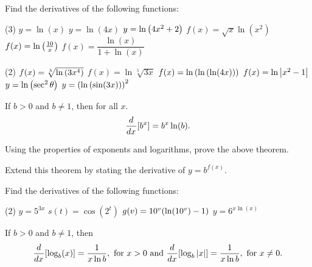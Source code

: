 \documentclass[mathNotesPreamble]{subfiles}
\begin{document}
  \begin{ex*}
    Find the derivatives of the following functions:
  \end{ex*}
  \begin{tasks}[after-item-skip=\stretch{1}, label=~](3)
    \task $y=\ln(x)$
    \task $y=\ln(4x)$
    \task $y=\ln{\left(4x^2+2\right)}$
    \task $f(x)=\sqrt x\ln(x^2)$
    \task $f(x)=\ln{\left(\frac{10}{x}\right)}$
    \task $f(x)=\dfrac{\ln(x)}{1+\ln(x)}$
  \end{tasks}
  \vfill
  
  \pagebreak
  \begin{tasks}[after-item-skip=\stretch{1}, label=~](2)
    \task $f(x)=\sqrt[5]{\ln{\left(3x^4\right)}}$
    \task $f(x)=\ln\sqrt[5]{3x}$
    \task $f(x)=\ln{\left(\ln{\left(\ln(4x)\right)}\right)}$
    \task $f(x)=\ln{\left\vert x^2-1\right\vert}$
    \task $y=\ln{\left(\sec^2\theta\right)}$
    \task $y={\left(\ln{\left(\sin(3x)\right)}\right)}^2$
  \end{tasks}
  \vfill 
  \pagebreak
  
  \begin{thmBox*}
    If $b>0$ and $b\neq 1$, then for all $x$.
      $${\frac{d^{}}{dx^{}}}{\left[b^x\right]}=b^x\ln(b).$$
  \end{thmBox*}

  \begin{ex*}
    Using the properties of exponents and logarithms, prove the above theorem. 
    
    \noindent
    Extend this theorem by stating the derivative of $y=b^{f(x)}$.
  \end{ex*}
  
  \begin{ex*}
    Find the derivatives of the following functions:
  \end{ex*}
  \begin{tasks}[after-item-skip=\stretch{1}, label=~](2)
    \task $y=5^{3x}$
    \task $s(t)=\cos(2^t)$
    \task $g(v)=10^v{\left(\ln(10^v)-1\right)}$
    \task $y=6^{x\ln(x)}$
  \end{tasks}
  \pagebreak
  
  \begin{thmBox*}
    If $b>0$ and $b\neq 1$, then
      \[{\frac{d^{}}{dx^{}}}{\left[\log_b(x)\right]}=\frac{1}{x\ln b},\text{ for }x>0 \text{ and }{\frac{d^{}}{dx^{}}}{\left[\log_b{\left\vert x\right\vert}\right]}=\frac{1}{x\ln b},\text{ for } x\neq 0.\]
  \end{thmBox*}
\end{document}
